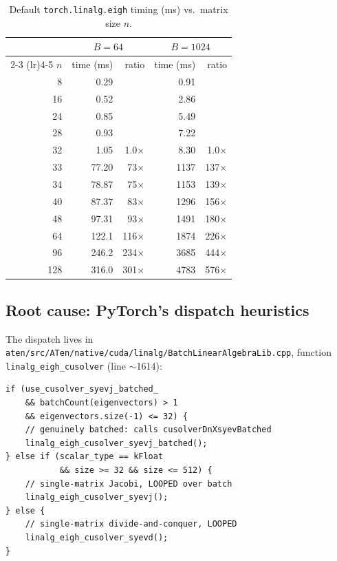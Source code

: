 \documentclass[10pt, letterpaper]{article}
\begin{document}
\begin{table}[h]
\centering
\caption{Default \texttt{torch.linalg.eigh} timing (ms) vs.\ matrix size $n$.}
\label{tab:default}
\begin{tabular}{r rr rr}
\toprule
 & \multicolumn{2}{c}{$B = 64$} & \multicolumn{2}{c}{$B = 1024$} \\
\cmidrule(lr){2-3} \cmidrule(lr){4-5}
$n$ & time (ms) & ratio & time (ms) & ratio \\
\midrule
  8  & 0.29  &        & 0.91   &         \\
 16  & 0.52  &        & 2.86   &         \\
 24  & 0.85  &        & 5.49   &         \\
 28  & 0.93  &        & 7.22   &         \\
 32  & 1.05  & 1.0$\times$  & 8.30   & 1.0$\times$   \\
\midrule
 33  & 77.20 & 73$\times$   & 1137   & 137$\times$   \\
 34  & 78.87 & 75$\times$   & 1153   & 139$\times$   \\
 40  & 87.37 & 83$\times$   & 1296   & 156$\times$   \\
 48  & 97.31 & 93$\times$   & 1491   & 180$\times$   \\
 64  & 122.1 & 116$\times$  & 1874   & 226$\times$   \\
 96  & 246.2 & 234$\times$  & 3685   & 444$\times$   \\
128  & 316.0 & 301$\times$  & 4783   & 576$\times$   \\
\bottomrule
\end{tabular}
\end{table}

\subsection{Root cause: PyTorch's dispatch heuristics}

The dispatch lives in
\texttt{aten/src/ATen/native/cuda/linalg/BatchLinearAlgebraLib.cpp},
function \texttt{linalg\_eigh\_cusolver} (line $\sim$1614):

\begin{lstlisting}
if (use_cusolver_syevj_batched_
    && batchCount(eigenvectors) > 1
    && eigenvectors.size(-1) <= 32) {
    // genuinely batched: calls cusolverDnXsyevBatched
    linalg_eigh_cusolver_syevj_batched();
} else if (scalar_type == kFloat
           && size >= 32 && size <= 512) {
    // single-matrix Jacobi, LOOPED over batch
    linalg_eigh_cusolver_syevj();
} else {
    // single-matrix divide-and-conquer, LOOPED
    linalg_eigh_cusolver_syevd();
}
\end{lstlisting}
\end{document}
